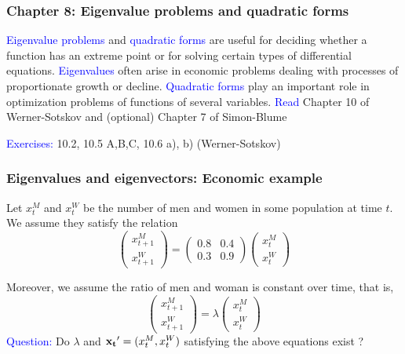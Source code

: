 \documentclass[11pt,aspectratio=169]{beamer}
\begin{document}
\begin{frame}
\frametitle{Chapter 8: Eigenvalue problems and quadratic forms}
\begin{small}
\textcolor{blue}{Eigenvalue problems} and \textcolor{blue}{quadratic forms} are useful for deciding whether a function has an extreme point or for solving certain types of differential equations.
\vskip 12pt
 \textcolor{blue}{Eigenvalues} often arise in economic problems dealing with processes of proportionate growth or decline.
\vskip 12pt
\textcolor{blue}{Quadratic forms} play an important role in optimization problems of functions of several variables. 
\vskip 12pt
\textcolor{blue}{Read}  Chapter 10 of Werner-Sotskov and (optional) Chapter 7 of Simon-Blume

\vskip 12pt
\textcolor{blue}{Exercises:} 10.2, 10.5 A,B,C, 10.6 a), b) (Werner-Sotskov)


\end{small}
\end{frame}

\begin{frame}
\frametitle{Eigenvalues and eigenvectors: Economic example}
\begin{small}
Let $x_t^M$ and $x_t^W$ be the number of men and women in some population at time $t$. 
\vskip 10pt
We assume they satisfy the relation
\begin{equation*}
\begin{pmatrix}
x^M_{t+1} \\
x_{t+1}^W
\end{pmatrix}
=\begin{pmatrix}
0.8 & 0.4  \\
0.3 & 0.9
\end{pmatrix}
\begin{pmatrix}
x^M_{t} \\
x_{t}^W
\end{pmatrix}
\end{equation*}

Moreover, we assume the ratio of men and woman is constant over time, that is,
 \begin{equation*}
\begin{pmatrix}
x^M_{t+1} \\
x_{t+1}^W
\end{pmatrix}
=\lambda
\begin{pmatrix}
x^M_{t} \\
x_{t}^W
\end{pmatrix}
\end{equation*}
\vskip 12pt
\textcolor{blue}{Question:} Do $\lambda$ and ${\bf x_t}'=(x_t^M, x_t^W)$ satisfying the above equations exist ? 

\end{small}
\end{frame}
\end{document}
